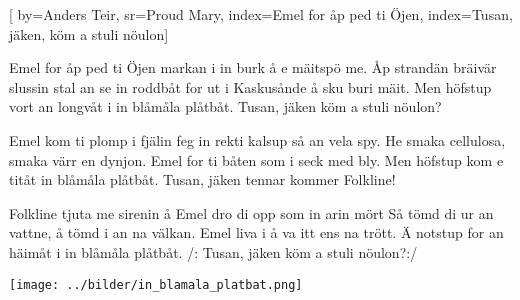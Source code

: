 

[ 		%
	by={Anders Teir},					%
	sr={Proud Mary},					%
	index={Emel for åp ped ti Öjen}, 						%
	index={Tusan, jäken, köm a stuli nöulon}]						%
	

\beginverse*						%
Emel for åp ped ti Öjen
markan i in burk å e mäitspö me.
Åp strandän bräivär slussin
stal an se in roddbåt
for ut i Kaskusånde å sku buri mäit.
Men höfstup vort an longvåt
i in blåmåla plåtbåt.
Tusan, jäken
köm a stuli nöulon?
\endverse							%

\beginverse*						%
Emel kom ti plomp i fjälin
feg in rekti kalsup så an vela spy.
He smaka cellulosa,
smaka värr en dynjon.
Emel for ti båten som i seck med bly.
Men höfstup kom e titåt
in blåmåla plåtbåt.
Tusan, jäken
tennar kommer Folkline!
\endverse							%

\beginverse*						%
Folkline tjuta me sirenin
å Emel dro di opp som in arin mört
Så tömd di ur an vattne,
å tömd i an na välkan.
Emel liva i å va itt ens na trött.
Ä notstup for an häimåt
i in blåmåla plåtbåt.
/: Tusan, jäken
köm a stuli nöulon?:/
\endverse							%
\endsong							%

\begin{intersong}
	\begin{center}
		\vspace{20mm}
\texttt{[image: ../bilder/in\_blamala\_platbat.png]} 
\end{center}
\end{intersong}
